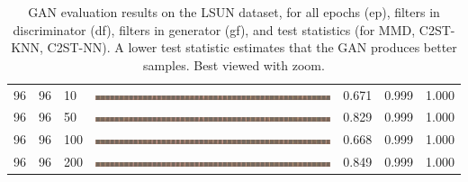 \documentclass[a4paper]{article}
\begin{document}
\begin{table}[h!]
\begin{center}
{\begin{tabular}{lllcccc}
      96 & 96 & 10  & \includegraphics[width=\textwidth,trim={1536px 0 0 0},clip]{figures/bedrooms_g96_d96_ep10_generator.jpg}   & 0.671 & 0.999 & 1.000\\
      96 & 96 & 50  & \includegraphics[width=\textwidth,trim={1536px 0 0 0},clip]{figures/bedrooms_g96_d96_ep50_generator.jpg}   & 0.829 & 0.999 & 1.000\\
      96 & 96 & 100 & \includegraphics[width=\textwidth,trim={1536px 0 0 0},clip]{figures/bedrooms_g96_d96_ep100_generator.jpg}  & 0.668 & 0.999 & 1.000\\
      96 & 96 & 200 & \includegraphics[width=\textwidth,trim={1536px 0 0 0},clip]{figures/bedrooms_g96_d96_ep200_generator.jpg}  & 0.849 & 0.999 & 1.000\\
      \hline
    \end{tabular}
    }
    \end{center}
    \vspace{-0.2cm}
    \caption{GAN evaluation results on the LSUN dataset, for all epochs (ep),
    filters in discriminator (df), filters in generator (gf), and test
    statistics (for MMD, C2ST-KNN, C2ST-NN). A lower test statistic estimates
    that the GAN produces better samples. Best viewed with zoom.}
    \vspace{-0.2cm}
    \label{table:bedrooms}
  \end{table}
  \clearpage
  \newpage
\end{document}
